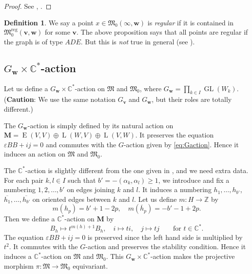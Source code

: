 \documentclass[12pt]{amsart}
\def\Bbb{\mathbb}
\def\frak{\mathfrak}
\theoremstyle{definition}
\newtheorem{Definition}[equation]{Definition}
\theoremstyle{remark}
\numberwithin{equation}{subsection}
\newcommand{\C}{{\Bbb C}}
\newcommand{\Z}{{\Bbb Z}}
\newcommand{\GL}{\operatorname{GL}}
\newcommand{\bM}{{\mathbf M}} %
\newcommand{\M}{{\frak M}} %
\newcommand{\Mreg}{{\frak M_0^{\operatorname{reg}}}}
\newcommand{\bv}{{\mathbf v}} %
\newcommand{\bw}{{\mathbf w}} %
\newcommand{\HomE}{\operatorname{E}}
\newcommand{\HomL}{\operatorname{L}}
\begin{document}
\begin{proof}
See \cite[6.7]{Na-quiver}, \cite[3.28]{Na-alg}.
\end{proof}

\begin{Definition}\label{def:regular}
We say a point $x\in\M_0(\infty,\bw)$ is {\it regular\/} if it is
contained in $\Mreg(\bv,\bw)$ for some $\bv$. The above proposition
says that all points are regular if the graph is of type $ADE$. But
this is {\it not\/} true in general (see \cite[10.10]{Na-alg}).
\end{Definition}

\subsection{$G_\bw\times \C^*$-action}\label{subsec:Gw-action}
Let us define a $G_\bw\times\C^*$-action on $\M$ and $\M_0$, where
$G_\bw = \prod_{k\in I} \GL(W_k)$. ({\bf Caution}: We use the same
notation $G_\bv$ and $G_\bw$, but their roles are totally different.)

The $G_\bw$-action is simply defined by its natural action on
$\bM = \HomE(V,V)\oplus\HomL(W,V)\oplus \HomL(V,W)$. It preserves the
equation $\varepsilon B B + ij = 0$ and commutes with the $G$-action
given by \eqref{eq:Gaction}. Hence it induces an action on $\M$ and
$\M_0$.

The $\C^*$-action is slightly different from the one given in
\cite[3.iv]{Na-alg}, and we need extra data. For each pair $k,l\in I$
such that $b' = -(\alpha_k,\alpha_l) \ge 1$, we introduce and fix a
numbering $1,2,\dots,b'$ on edges joining $k$ and $l$. It induces a
numbering $h_1, \dots, h_{b'}$, $\overline{h_1}, \dots,
\overline{h_{b'}}$ on oriented edges between $k$ and $l$. Let us
define $m\colon H\to\Z$ by
\begin{equation}\label{eq:m(h)}
  m(h_p) = b'+1-2p, \quad
  m(\overline h_p) = -b'-1+2p.
\end{equation}
Then we define a $\C^*$-action on $\bM$ by
\begin{equation}\label{eq:C*action}
B_{h} \mapsto t^{m(h)+1} B_{h}, \quad
i \mapsto t i, \quad j \mapsto t j \qquad
\text{for $t\in \C^*$}.
\end{equation}
The equation $\varepsilon B B + ij = 0$ is preserved since the left
hand side is multiplied by $t^2$. It commutes with the $G$-action and
preserves the stability condition.
Hence it induces a $\C^*$-action on $\M$ and $\M_0$.
This $G_\bw\times\C^*$-action makes the projective morphism
$\pi\colon \M\to\M_0$ equivariant.
\end{document}
